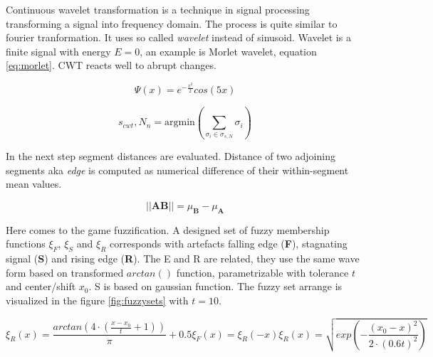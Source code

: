 Continuous wavelet transformation is a technique in signal processing transforming a signal into frequency domain.
The process is quite similar to fourier tranformation. It uses so called {\it wavelet} instead of sinusoid.
Wavelet is a finite signal with energy $E=0$, an example is Morlet wavelet, equation \ref{eq:morlet}.
CWT reacts well to abrupt changes.

\begin{equation}
\Psi(x) = e^{-\frac{x^2}{2}} cos(5x)
\label{eq:morlet}
\end{equation}

\begin{equation}
s_{cwt}, N_{n} = \text{argmin} ( \sum_{\sigma_i \in \sigma_{s,N}} \sigma_i )
\label{eq:cwtparamssearch}
\end{equation}

In the next step segment distances are evaluated. Distance of two adjoining segments aka {\it edge} is computed as numerical
difference of their within-segment mean values.

\begin{equation}
||\textbf{AB}|| = \mu_\textbf{B} - \mu_\textbf{A}
\end{equation}

Here comes to the game fuzzification. A designed set of fuzzy membership functions $\xi_F$, $\xi_S$ and $\xi_R$
corresponds with artefacts falling edge (\textbf{F}), stagnating signal (\textbf{S}) and rising edge (\textbf{R}).
The E and R are related, they use the same wave form based on transformed $arctan()$ function, parametrizable with
tolerance $t$ and center/shift $x_0$. S is based on gaussian function. The fuzzy set arrange is visualized
in the figure \ref{fig:fuzzysets} with $t=10$.

\begin{subequations}
\begin{equation}
\xi_R(x) = \frac{ arctan( 4\cdot (\frac{x - x_0}{t} + 1) )}{\pi} + 0.5
\end{equation}
\begin{equation}
\xi_F(x) = \xi_R(-x)
\end{equation}
\begin{equation}
\xi_R(x) = \sqrt{ exp( -\frac{(x_0 - x)^2}{2\cdot (0.6t)^2} ) }
\end{equation}
\end{subequations}


